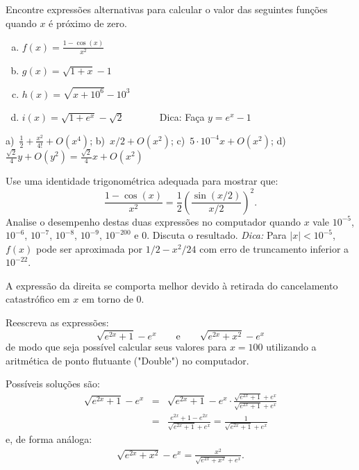 \begin{exer} Encontre expressões alternativas para calcular o valor das seguintes funções quando $x$ é próximo de zero.
\begin{enumerate}[a)]
\item $f(x)=\frac{1-\cos(x)}{x^2}$
\item $g(x)=\sqrt{1+x}-1$
\item $h(x)=\sqrt{x+10^6}-10^3$
\item $i(x)=\sqrt{1+e^{x}}-\sqrt{2}$ ~~~~~~ Dica: Faça $y=e^{x}-1$
\end{enumerate}
\end{exer}
\begin{resp}
    a)~$\frac{1}{2}+\frac{x^2}{4!}+O(x^4)$; b)~$x/2+O(x^2)$; c)~$5\cdot 10^{-4}x+O(x^2)$; d)~$\frac{\sqrt{2}}{4}y+O(y^{2})=\frac{\sqrt{2}}{4}x+O(x^2)$
\end{resp}

\begin{exer} Use uma identidade trigonométrica adequada para mostrar que:
  \begin{equation*}
    \frac{1-\cos(x)}{x^2}= \frac{1}{2} \left(\frac{\sin(x/2)}{x/2}\right)^2.
  \end{equation*}
Analise o desempenho destas duas expressões no computador quando $x$ vale $10^{-5}$, $10^{-6}$, $10^{-7}$, $10^{-8}$, $10^{-9}$, $10^{-200}$ e $0$. Discuta o resultado.
\emph{Dica:} Para $|x|<10^{-5}$, $f(x)$ pode ser aproximada por $1/2-x^2/24$ com erro de truncamento inferior a $10^{-22}$.
\end{exer}
\begin{resp}
 A expressão da direita se comporta melhor devido à retirada do cancelamento catastrófico em $x$ em torno de $0$.
\end{resp}




\begin{exer} Reescreva as expressões:
  $$\sqrt{e^{2x}+1}-e^x \qquad\text{e}\qquad \sqrt{e^{2x}+x^2}-e^x $$
  de modo que seja possível calcular seus valores para $x=100$ utilizando a aritmética de ponto flutuante ("Double") no computador.
\end{exer}
\begin{resp}
 Possíveis soluções são:
 \begin{eqnarray*}
  \sqrt{e^{2x}+1}-e^x &=& \sqrt{e^{2x}+1}-e^x \cdot \frac{\sqrt{e^{2x}+1}+e^x }{\sqrt{e^{2x}+1}+e^x }\\
&=&  \frac{e^{2x}+1-e^{2x} }{\sqrt{e^{2x}+1}+e^x }= \frac{1}{\sqrt{e^{2x}+1}+e^x }
 \end{eqnarray*}
e, de forma análoga:
 \begin{eqnarray*}
  \sqrt{e^{2x}+x^2}-e^x = \frac{x^2}{\sqrt{e^{2x}+x^2}+e^x}.
 \end{eqnarray*}
\end{resp}


